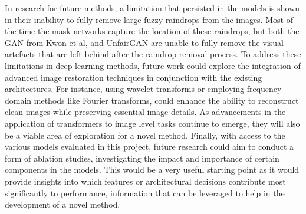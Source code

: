 \documentclass[11pt]{ociamthesis}  %
\begin{document}
In research for future methods, a limitation that persisted in the models is shown in their inability to fully remove large fuzzy raindrops from the images. Most of the time the mask networks capture the location of these raindrops, but both the GAN from Kwon et al, and UnfairGAN are unable to fully remove the visual artefacts that are left behind after the raindrop removal process. To address these limitations in deep learning methods, future work could explore the integration of advanced image restoration techniques in conjunction with the existing architectures. For instance, using wavelet transforms or employing frequency domain methods like Fourier transforms, could enhance the ability to reconstruct clean images while preserving essential image details. As advancements in the application of transformers to image level tasks continue to emerge, they will also be a viable area of exploration for a novel method. Finally, with access to the various models evaluated in this project, future research could aim to conduct a form of ablation studies, investigating the impact and importance of certain components in the models. This would be a very useful starting point as it would provide insights into which features or architectural decisions contribute most significantly to performance, information that can be leveraged to help in the development of a novel method.


\clearpage
\begin{spacing}{1}
\small
\setlength{\bibsep}{0pt}
\setlength{\bibhang}{1em}
\setlength{\columnsep}{10pt}
\twocolumn


\end{spacing}
\end{document}
